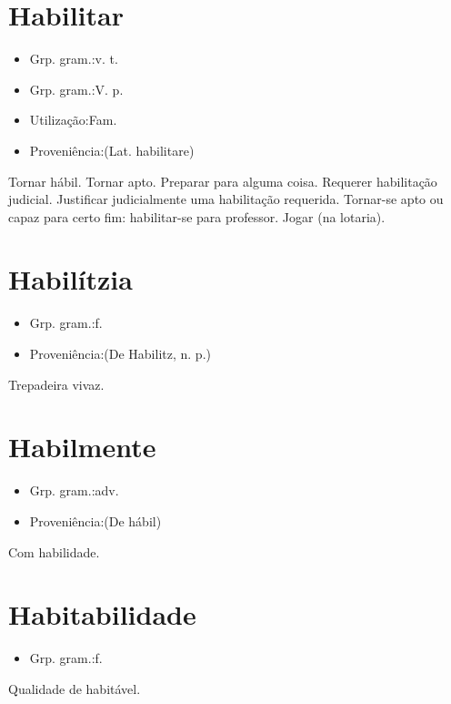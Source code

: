 \documentclass{article}
\begin{document}
\section{Habilitar}
\begin{itemize}
\item {Grp. gram.:v. t.}
\end{itemize}
\begin{itemize}
\item {Grp. gram.:V. p.}
\end{itemize}
\begin{itemize}
\item {Utilização:Fam.}
\end{itemize}
\begin{itemize}
\item {Proveniência:(Lat. \textunderscore habilitare\textunderscore )}
\end{itemize}
Tornar hábil.
Tornar apto.
Preparar para alguma coisa.
Requerer habilitação judicial.
Justificar judicialmente uma habilitação requerida.
Tornar-se apto ou capaz para certo fim: \textunderscore habilitar-se para professor\textunderscore .
Jogar (na lotaria).
\section{Habilítzia}
\begin{itemize}
\item {Grp. gram.:f.}
\end{itemize}
\begin{itemize}
\item {Proveniência:(De \textunderscore Habilitz\textunderscore , n. p.)}
\end{itemize}
Trepadeira vivaz.
\section{Habilmente}
\begin{itemize}
\item {Grp. gram.:adv.}
\end{itemize}
\begin{itemize}
\item {Proveniência:(De \textunderscore hábil\textunderscore )}
\end{itemize}
Com habilidade.
\section{Habitabilidade}
\begin{itemize}
\item {Grp. gram.:f.}
\end{itemize}
Qualidade de habitável.
\end{document}

